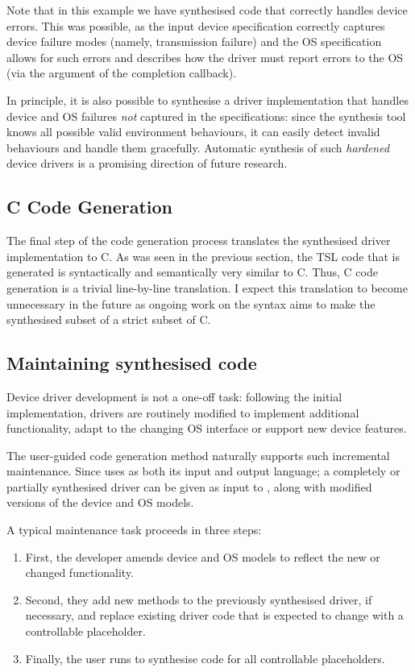Note that in this example we have synthesised code that correctly handles device errors.  This was possible, as the input device specification correctly captures device failure modes (namely, transmission failure) and the OS specification allows for such errors and describes how the driver must report errors to the OS (via the  argument of the completion callback).

In principle, it is also possible to synthesise a driver implementation that handles device and OS failures \emph{not} captured in the specifications: since the synthesis tool knows all possible valid environment behaviours, it can easily detect invalid behaviours and handle them gracefully.  Automatic synthesis of such \emph{hardened} device drivers is a promising direction of future research.

\subsection{C Code Generation}

The final step of the code generation process translates the synthesised driver implementation to C. As was seen in the previous section, the TSL code that is generated is syntactically and semantically very similar to C. Thus, C code generation is a trivial line-by-line translation. I expect this translation to become unnecessary in the future as ongoing work on the \tsl syntax aims to make the synthesised subset of \tsl a strict subset of C.

\subsection{Maintaining synthesised code~~} 
Device driver development is not a one-off task: following the initial implementation, drivers are routinely modified to implement additional functionality, adapt to the changing OS interface or support new device features.

The user-guided code generation method naturally supports such incremental maintenance. Since \termite uses \tsl as both its input and output language;  a completely or partially synthesised driver can be given as input to \termite, along with modified versions of the device and OS models.

A typical maintenance task proceeds in three steps:

\begin{enumerate}
    \item First, the developer amends device and OS models to reflect the new or changed functionality.  
    \item Second, they add new methods to the previously synthesised driver, if necessary, and replace existing driver code that is expected to change with a controllable  placeholder.  
    \item Finally, the user runs \termite to synthesise code for all controllable placeholders.  
\end{enumerate}
        
